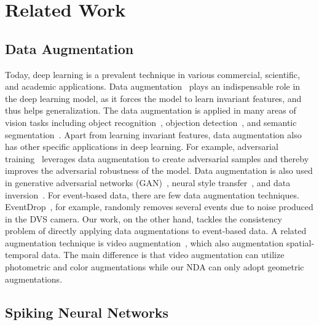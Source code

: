 \documentclass[runningheads]{llncs}
\begin{document}
\section{Related Work}
\subsection{Data Augmentation}

Today, deep learning is a prevalent technique in various commercial, scientific, and academic applications. 
Data augmentation~\cite{shorten2019survey} plays an indispensable role in the deep learning model, as it forces the model to learn invariant features, and thus helps generalization.
The data augmentation is applied in many areas of vision tasks including object recognition~\cite{cubuk2018autoaugment,lim2019fastautoaug,cubuk2020randaugment}, objection detection~\cite{zoph2020learning}, and semantic segmentation~\cite{ronneberger2015u}. 
Apart from learning invariant features, data augmentation also has other specific applications in deep learning. For example, adversarial training~\cite{ganin2016domain,tramer2017ensemble} leverages data augmentation to create adversarial samples and thereby improves the adversarial robustness of the model. Data augmentation is also used in generative adversarial networks (GAN)~\cite{arjovsky2017wasserstein,karras2017progressive,gulrajani2017improved,brock2018large}, neural style transfer~\cite{jing2019neural,gatys2016image}, and data inversion~\cite{zhang2021diversifying,li2021mixmix}.
For event-based data, there are few data augmentation techniques. EventDrop~\cite{gu2021eventdrop}, for example, randomly removes several events due to noise produced in the DVS camera. Our work, on the other hand, tackles the consistency problem of directly applying data augmentations to event-based data. 
A related augmentation technique is video augmentation~\cite{budvytis2017large}, which also augmentation spatial-temporal data. The main difference is that video augmentation can utilize photometric and color augmentations while our NDA can only adopt geometric augmentations. 


\subsection{Spiking Neural Networks}
\end{document}
